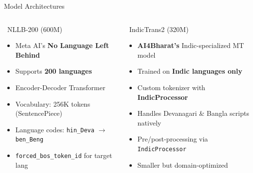 \documentclass[aspectratio=169]{beamer}
\begin{document}
\begin{frame}{Model Architectures}
\begin{columns}[T]
    \begin{block}{\faFacebook~NLLB-200 (600M)}
      \begin{itemize}
        \item Meta AI's \textbf{No Language Left Behind}
        \item Supports \textbf{200 languages}
        \item Encoder-Decoder Transformer
        \item Vocabulary: 256K tokens (SentencePiece)
        \item Language codes: \texttt{hin\_Deva} $\rightarrow$ \texttt{ben\_Beng}
        \item \texttt{forced\_bos\_token\_id} for target lang
      \end{itemize}
    \end{block}
    \begin{block}{\faLanguage~IndicTrans2 (320M)}
      \begin{itemize}
        \item \textbf{AI4Bharat's} Indic-specialized MT model
        \item Trained on \textbf{Indic languages only}
        \item Custom tokenizer with \textbf{IndicProcessor}
        \item Handles Devanagari \& Bangla scripts natively
        \item Pre/post-processing via \texttt{IndicProcessor}
        \item Smaller but domain-optimized
      \end{itemize}
    \end{block}
\end{columns}
\vspace{0.5em}
\end{frame}
\end{document}
